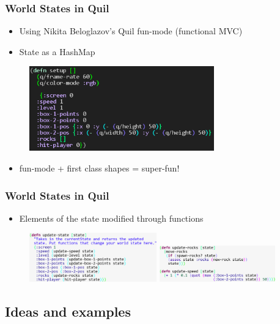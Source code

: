 \documentclass{beamer}
\begin{document}
\begin{frame}
\frametitle{World States in Quil}
	\begin{itemize}
		\item  Using Nikita Beloglazov's  Quil fun-mode (functional MVC)
		\item State as a HashMap
	\end{itemize}
	\begin{figure}
		\includegraphics[width=8cm]{PresentationImages/setupCode.png}
	\end{figure}
	\begin{itemize}
		\item fun-mode + first class shapes = super-fun!
	\end{itemize}
\end{frame}

\begin{frame}
\frametitle{World States in Quil}
\begin{itemize}
		\item Elements of the state modified through functions
	\end{itemize}
	\begin{figure}
		\includegraphics[width=5.5cm]{PresentationImages/updateCode.png}
		\hspace{0.1cm}
		\includegraphics[width=5cm]{PresentationImages/updateFunctionsCode.png}
	\end{figure}
\end{frame}




\subsection{Ideas and examples}
\end{document}
